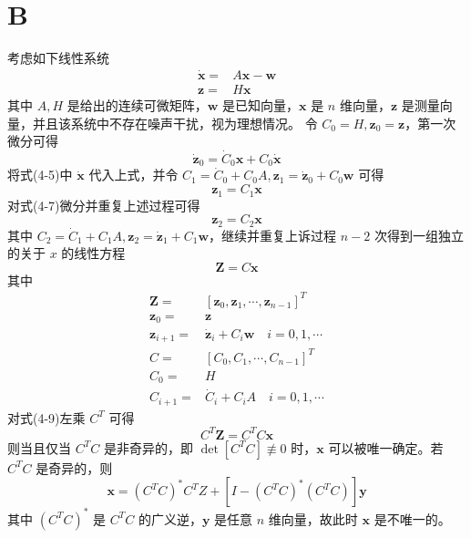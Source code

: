 \section*{B}
考虑如下线性系统
\begin{equation}
	\begin{split}
		\dot{\bm{x}} =& A\bm{x} - \bm{w} \\
		\bm{z} =& H \bm{x}
	\end{split}	
\end{equation}
其中 $A,H$ 是给出的连续可微矩阵，$\bm{w}$ 是已知向量，$\bm{x}$ 是 $n$ 维向量，$\bm{z}$ 是测量向量，并且该系统中不存在噪声干扰，视为理想情况。
令 $C_0 = H, \bm{z}_0 = \bm{z}$，第一次微分可得
\begin{equation}
	\dot{\bm{z}}_0 = \dot{C}_0\bm{x} + C_0\dot{\bm{x}}
\end{equation}
将式(4-5)中 $\dot{\bm{x}}$ 代入上式，并令 $C_1=\dot{C}_0 + C_0A,\bm{z}_1=\dot{\bm{z}}_0 + C_0\bm{w}$ 可得
\begin{equation}
	\bm{z}_1 = C_1 \bm{x}
\end{equation}
对式(4-7)微分并重复上述过程可得
\begin{equation}
	\bm{z}_2 = C_2 \bm{x}
\end{equation}
其中 $C_2 = \dot{C}_1 + C_1 A,\bm{z}_2 = \dot{\bm{z}}_1 + C_1\bm{w}$，继续并重复上诉过程 $n-2$ 次得到一组独立的关于 $x$ 的线性方程
\begin{equation}
	\bm{Z} = C\bm{x}
\end{equation}
其中
\begin{equation}
	\begin{split}
		\bm{Z} =& [\bm{z}_0,\bm{z}_1,\cdots,\bm{z}_{n-1}]^T \\
		\bm{z}_0 =& \bm{z} \\
		\bm{z}_{i+1} =& \dot{\bm{z}}_{i} + C_i\bm{w} \quad i=0,1,\cdots\\
		C =& [C_0,C_1,\cdots,C_{n-1}]^T \\
		C_0 =& H \\
		C_{i+1} =& \dot{C}_i + C_i A \quad i=0,1,\cdots
	\end{split}
\end{equation}
对式(4-9)左乘 $C^T$ 可得
\begin{equation}
	C^T\bm{Z} = C^TC \bm{x}
\end{equation}
则当且仅当 $C^TC$ 是非奇异的，即 $\det[C^TC] \not \equiv 0$ 时，$\bm{x}$ 可以被唯一确定。若 $C^TC$ 是奇异的，则
\begin{equation}
	\bm{x} = (C^TC)^*C^T Z + [I- (C^TC)^* (C^TC)]\bm{y}
\end{equation}
其中 $(C^TC)^*$ 是 $C^TC$ 的广义逆，$\bm{y}$ 是任意 $n$ 维向量，故此时 $\bm{x}$ 是不唯一的。